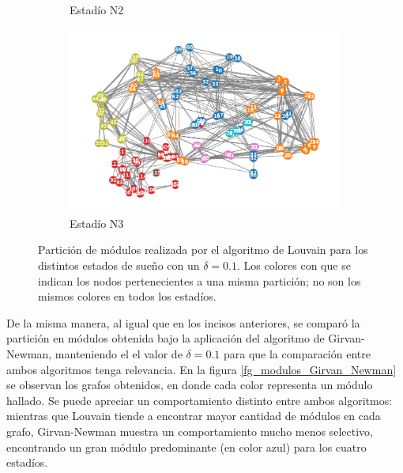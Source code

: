 \documentclass{article}
\begin{document}
\begin{figure}[!htb]
\begin{subfigure}[b]{0.45\textwidth}
        \caption{Estadío N2}
        \label{modulos_N2}
	\end{subfigure}
 	\begin{subfigure}[b]{0.45\textwidth}
		\includegraphics[width= \textwidth]{fg/modulos_N3.png}
        \caption{Estadío N3}
        \label{modulos_N3}
	\end{subfigure}
	\caption{Partición de módulos realizada por el algoritmo de Louvain para los distintos estados de sueño con un $\delta = 0.1$. Los colores con que se indican los nodos pertenecientes a una misma partición; no son los mismos colores en todos los estadíos.}	
    \label{fg_modulos_Louvain}
\end{figure}

De la misma manera, al igual que en los incisos anteriores, se comparó la partición en módulos obtenida bajo la aplicación del algoritmo de Girvan-Newman, manteniendo el el valor de $\delta = 0.1$ para que la comparación entre ambos algoritmos tenga relevancia. 
En la figura \ref{fg_modulos_Girvan_Newman} se observan los grafos obtenidos, en donde cada color representa un módulo hallado. Se puede apreciar un comportamiento distinto entre ambos algoritmos: mientras que Louvain tiende a encontrar mayor cantidad de módulos en cada grafo, Girvan-Newman muestra un comportamiento mucho menos selectivo, encontrando un gran módulo predominante (en color azul) para los cuatro estadíos. 
\end{document}
